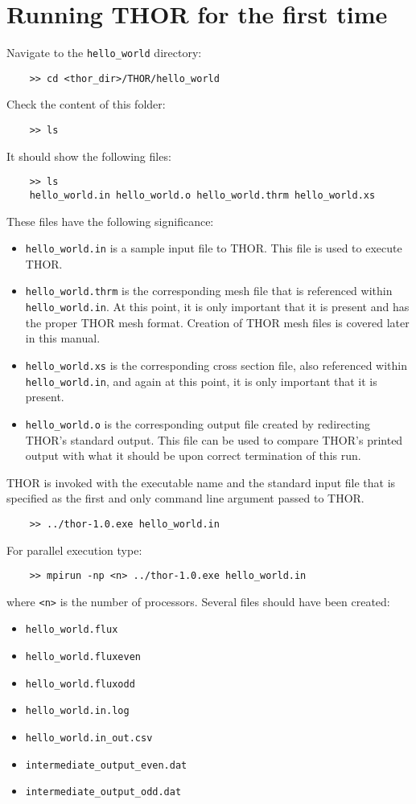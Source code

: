 \section{Running THOR for the first time}
Navigate to the \verb"hello_world" directory:
\begin{verbatim}
    >> cd <thor_dir>/THOR/hello_world
\end{verbatim}
Check the content of this folder:
\begin{verbatim}
    >> ls
\end{verbatim}
It should show the following files:
\begin{verbatim}
    >> ls
    hello_world.in hello_world.o hello_world.thrm hello_world.xs
\end{verbatim}
These files have the following significance:
\begin{itemize}
    \item \verb"hello_world.in" is a sample input file to THOR. This file is used to execute THOR.
    \item \verb"hello_world.thrm" is the corresponding mesh file that is referenced within \verb"hello_world.in". At this point, it is only important that it is present and has the proper THOR mesh format. Creation of THOR mesh files is covered later in this manual.
    \item \verb"hello_world.xs" is the corresponding cross section file, also referenced within \verb"hello_world.in", and again at this point, it is only important that it is present.
    \item \verb"hello_world.o" is the corresponding output file created by redirecting THOR's standard output. This file can be used to compare THOR's printed output with what it should be upon correct termination of this run.
\end{itemize}
THOR is invoked with the executable name and the standard input file that is specified as the first and only command line argument passed to THOR.
\begin{verbatim}
    >> ../thor-1.0.exe hello_world.in
\end{verbatim}
For parallel execution type:
\begin{verbatim}
    >> mpirun -np <n> ../thor-1.0.exe hello_world.in
\end{verbatim}
where \verb"<n>" is the number of processors.
Several files should have been created:
\begin{itemize}
    \item \verb"hello_world.flux"
    \item \verb"hello_world.fluxeven"
    \item \verb"hello_world.fluxodd"
    \item \verb"hello_world.in.log"
    \item \verb"hello_world.in_out.csv"
    \item \verb"intermediate_output_even.dat"
    \item \verb"intermediate_output_odd.dat"
\end{itemize}
